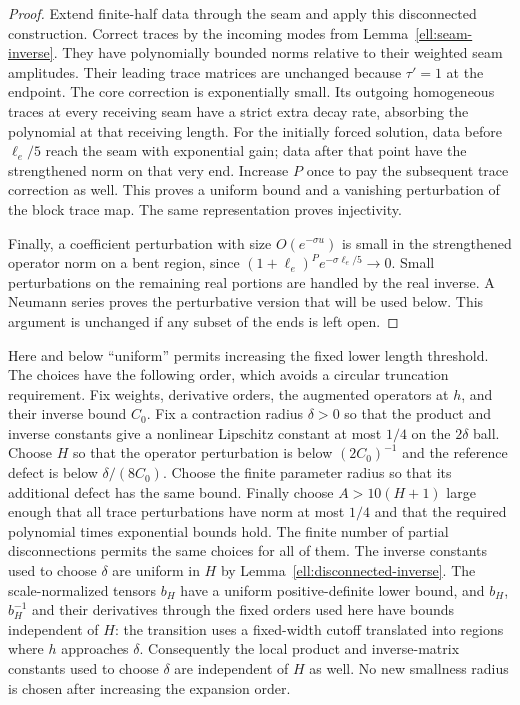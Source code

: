 \begin{proof}
Extend finite-half data through the seam and apply this
disconnected construction.  Correct traces by the incoming modes
from Lemma~\ref{ell:seam-inverse}.  They have polynomially bounded
norms relative to their weighted seam amplitudes.  Their leading
trace matrices are unchanged because $\tau'=1$ at the endpoint.
The core correction is exponentially small.  Its outgoing
homogeneous traces at every receiving seam have a strict extra
decay rate, absorbing the polynomial at that receiving length.
For the initially forced solution, data before $\ell_e/5$ reach
the seam with exponential gain; data after that point have the
strengthened norm on that very end.  Increase $P$ once to pay
the subsequent trace correction as well.  This proves a uniform
bound and a vanishing perturbation of the block trace map.
The same representation proves injectivity.

Finally, a coefficient perturbation with size $O(e^{-\sigma u})$
is small in the strengthened operator norm on a bent region,
since $(1+\ell_e)^Pe^{-\sigma\ell_e/5}\to0$.
Small perturbations on the remaining real portions are handled
by the real inverse.  A Neumann series proves the perturbative
version that will be used below.  This argument is unchanged if
any subset of the ends is left open.
\end{proof}

Here and below ``uniform'' permits increasing the fixed lower
length threshold.  The choices have the following order, which
avoids a circular truncation requirement.  Fix weights, derivative
orders, the augmented operators at $h$, and their inverse bound
$C_0$.  Fix a contraction radius $\delta>0$ so that the product
and inverse constants give a nonlinear Lipschitz constant at most
$1/4$ on the $2\delta$ ball.  Choose $H$ so that the operator
perturbation is below $(2C_0)^{-1}$ and the reference defect is
below $\delta/(8C_0)$.  Choose the finite parameter radius so
that its additional defect has the same bound.  Finally choose
$A>10(H+1)$ large enough that all trace perturbations have norm
at most $1/4$ and that the required polynomial times exponential
bounds hold.  The finite number of partial disconnections permits
the same choices for all of them.  The inverse constants used to
choose $\delta$ are uniform in $H$ by
Lemma~\ref{ell:disconnected-inverse}.  The scale-normalized tensors
$b_H$ have a uniform positive-definite lower bound, and $b_H$,
$b_H^{-1}$ and their derivatives through the fixed orders used
here have bounds independent of $H$: the transition uses a
fixed-width cutoff translated into regions where $h$ approaches
$\delta$.  Consequently the local product and inverse-matrix
constants used to choose $\delta$ are independent of $H$ as well.
No new smallness radius is
chosen after increasing the expansion order.

